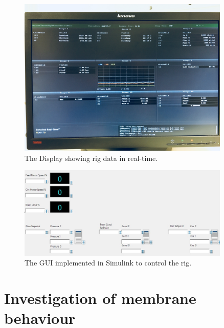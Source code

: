 \begin{figure}[H]
    \centering
    \includegraphics[width=0.9\textwidth]{Display}
    \caption{The Display showing rig data in real-time.}
    \label{fig:display}
\end{figure}
\begin{figure}[H]
    \centering
    \includegraphics[width=0.9\textwidth]{GUI}
    \caption{The GUI implemented in Simulink to control the rig.}
    \label{fig:gui}
\end{figure}


\newpage


\section{Investigation of membrane behaviour}

